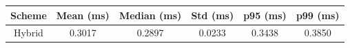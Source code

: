 \begin{tabular}{cccccc}
\hline
Scheme & Mean (ms) & Median (ms) & Std (ms) & p95 (ms) & p99 (ms) \\
\hline
Hybrid & 0.3017 & 0.2897 & 0.0233 & 0.3438 & 0.3850 \\
\hline
\end{tabular}
